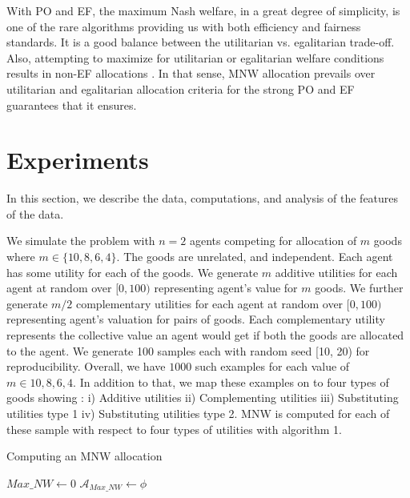 With PO and EF, the maximum Nash welfare, in a great degree of simplicity, is one of the rare algorithms providing us with both efficiency and fairness standards. It is a good balance between the utilitarian vs. egalitarian trade-off. Also, attempting to maximize for utilitarian or egalitarian welfare conditions results in non-EF allocations \cite{caragiannis2016unreasonable}. In that sense, MNW allocation prevails over utilitarian and egalitarian allocation criteria for the strong PO and EF guarantees that it ensures.


\section{Experiments}
\label{section_experiments}
In this section, we describe the data, computations, and analysis of the features of the data.

We simulate the problem with $n = 2$ agents competing for allocation of $m$ goods where $m \in \{10, 8, 6, 4\}$. The goods are unrelated, and independent. Each agent has some utility for each of the goods. We generate $m$ additive utilities for each agent at random over $[0, 100)$ representing agent's value for $m$ goods. We further generate $m/2$ complementary utilities for each agent at random over $[0, 100)$ representing agent's valuation for pairs of goods. Each complementary utility represents the collective value an agent would get if both the goods are allocated to the agent. We generate 100 samples each with random seed [10, 20) for reproducibility. Overall, we have $1000$ such examples for each value of $m \in {10, 8, 6, 4}$. In addition to that, we map these examples on to four types of goods showing : i) Additive utilities ii) Complementing utilities iii) Substituting utilities type 1 iv) Substituting utilities type 2.  MNW is computed for each of these sample with respect to four types of utilities with algorithm 1.

\BlankLine

\begin{algorithm}
\caption{ Computing an MNW allocation }
\SetAlgoLined
{}
 $Max\_NW \leftarrow 0 $ \;
 $\mathcal{A}_{Max\_NW} \leftarrow \phi $ \;
\end{algorithm}

